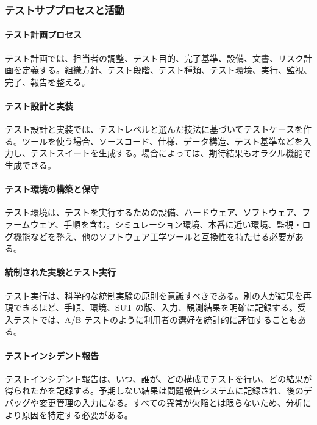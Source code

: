 \subsubsection{テストサブプロセスと活動}
\paragraph{テスト計画プロセス}
テスト計画では、担当者の調整、テスト目的、完了基準、設備、文書、リスク計画を定義する。組織方針、テスト段階、テスト種類、テスト環境、実行、監視、完了、報告を整える。

\paragraph{テスト設計と実装}
テスト設計と実装では、テストレベルと選んだ技法に基づいてテストケースを作る。ツールを使う場合、ソースコード、仕様、データ構造、テスト基準などを入力し、テストスイートを生成する。場合によっては、期待結果もオラクル機能で生成できる。

\paragraph{テスト環境の構築と保守}
テスト環境は、テストを実行するための設備、ハードウェア、ソフトウェア、ファームウェア、手順を含む。シミュレーション環境、本番に近い環境、監視・ログ機能などを整え、他のソフトウェア工学ツールと互換性を持たせる必要がある。

\paragraph{統制された実験とテスト実行}
テスト実行は、科学的な統制実験の原則を意識すべきである。別の人が結果を再現できるほど、手順、環境、SUT の版、入力、観測結果を明確に記録する。受入テストでは、A/B テストのように利用者の選好を統計的に評価することもある。

\paragraph{テストインシデント報告}
テストインシデント報告は、いつ、誰が、どの構成でテストを行い、どの結果が得られたかを記録する。予期しない結果は問題報告システムに記録され、後のデバッグや変更管理の入力になる。すべての異常が欠陥とは限らないため、分析により原因を特定する必要がある。

